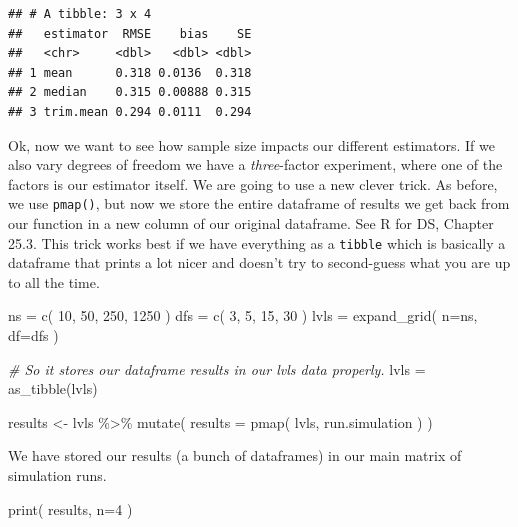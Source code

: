 \documentclass[
]{book}
\newenvironment{Shaded}{\begin{snugshade}}{\end{snugshade}}
\newcommand{\AttributeTok}[1]{\textcolor[rgb]{0.77,0.63,0.00}{#1}}
\newcommand{\CommentTok}[1]{\textcolor[rgb]{0.56,0.35,0.01}{\textit{#1}}}
\newcommand{\DecValTok}[1]{\textcolor[rgb]{0.00,0.00,0.81}{#1}}
\newcommand{\FunctionTok}[1]{\textcolor[rgb]{0.00,0.00,0.00}{#1}}
\newcommand{\NormalTok}[1]{#1}
\newcommand{\OtherTok}[1]{\textcolor[rgb]{0.56,0.35,0.01}{#1}}
\newcommand{\SpecialCharTok}[1]{\textcolor[rgb]{0.00,0.00,0.00}{#1}}
\begin{document}
\begin{verbatim}
## # A tibble: 3 x 4
##   estimator  RMSE    bias    SE
##   <chr>     <dbl>   <dbl> <dbl>
## 1 mean      0.318 0.0136  0.318
## 2 median    0.315 0.00888 0.315
## 3 trim.mean 0.294 0.0111  0.294
\end{verbatim}

Ok, now we want to see how sample size impacts our different estimators. If
we also vary degrees of freedom we have a \emph{three}-factor experiment, where
one of the factors is our estimator itself. We are going to use a new clever
trick. As before, we use \texttt{pmap()}, but now we store the entire dataframe of
results we get back from our function in a new column of our original
dataframe. See R for DS, Chapter 25.3. This trick works best if we have
everything as a \texttt{tibble} which is basically a dataframe that prints a lot
nicer and doesn't try to second-guess what you are up to all the time.

\begin{Shaded}
\begin{Highlighting}[]
\NormalTok{ns }\OtherTok{=} \FunctionTok{c}\NormalTok{( }\DecValTok{10}\NormalTok{, }\DecValTok{50}\NormalTok{, }\DecValTok{250}\NormalTok{, }\DecValTok{1250}\NormalTok{ )}
\NormalTok{dfs }\OtherTok{=} \FunctionTok{c}\NormalTok{( }\DecValTok{3}\NormalTok{, }\DecValTok{5}\NormalTok{, }\DecValTok{15}\NormalTok{, }\DecValTok{30}\NormalTok{ )}
\NormalTok{lvls }\OtherTok{=} \FunctionTok{expand\_grid}\NormalTok{( }\AttributeTok{n=}\NormalTok{ns, }\AttributeTok{df=}\NormalTok{dfs )}

\CommentTok{\# So it stores our dataframe results in our lvls data properly.}
\NormalTok{lvls }\OtherTok{=} \FunctionTok{as\_tibble}\NormalTok{(lvls)}

\NormalTok{results }\OtherTok{\textless{}{-}}\NormalTok{ lvls }\SpecialCharTok{\%\textgreater{}\%} \FunctionTok{mutate}\NormalTok{( }\AttributeTok{results =} \FunctionTok{pmap}\NormalTok{( lvls, run.simulation ) )}
\end{Highlighting}
\end{Shaded}

We have stored our results (a bunch of dataframes) in our main matrix of
simulation runs.

\begin{Shaded}
\begin{Highlighting}[]
\FunctionTok{print}\NormalTok{( results, }\AttributeTok{n=}\DecValTok{4}\NormalTok{ )}
\end{Highlighting}
\end{Shaded}
\end{document}
